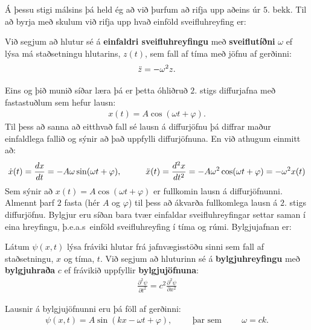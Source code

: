\ifdefined \wholebook \else\documentclass[oneside]{book}\usepackage{EdlBook}\graphicspath{{figures/}}
\begin{document}
Á þessu stigi málsins þá held ég að við þurfum að rifja upp aðeins úr $5.$ bekk. Til að byrja með skulum við rifja upp hvað einföld sveifluhreyfing er:

\begin{tcolorbox}
\begin{definition}
Við segjum að hlutur sé á \textbf{einfaldri sveifluhreyfingu} með \textbf{sveiflutíðni} $\omega$ ef lýsa má staðsetningu hlutarins, $z(t)$, sem fall af tíma með jöfnu af gerðinni:
\begin{align*}
    \Ddot{z} = - \omega^2z.
\end{align*}
\end{definition}
\end{tcolorbox}
Eins og þið munið síðar læra þá er þetta óhliðruð $2.$ stigs diffurjafna með fastastuðlum sem hefur lausn:
\begin{align*}
    x(t) = A\cos(\omega t + \varphi).
\end{align*}
Til þess að sanna að eitthvað fall sé lausn á diffurjöfnu þá diffrar maður einfaldlega fallið og sýnir að það uppfylli diffurjöfnuna. En við athugum einmitt að:
\begin{align*}
    \Dot{x}(t) =  \frac{dx}{dt} = -A\omega\sin(\omega t + \varphi), \hspace{1cm} \Ddot{x}(t) = \frac{d^2x}{dt^2} = -A\omega^2 \cos(\omega t + \varphi) = -\omega^2x(t)
\end{align*}
Sem sýnir að $x(t) = A\cos(\omega t + \varphi)$ er fullkomin lausn á diffurjöfnunni. Almennt þarf $2$ fasta (hér $A$ og $\varphi$) til þess að ákvarða fullkomlega lausn á $2.$ stigs diffurjöfnu. Bylgjur eru síðan bara tvær einfaldar sveifluhreyfingar settar saman í eina hreyfingu, þ.e.a.s~einföld sveifluhreyfing í tíma og rúmi. Bylgjujafnan er:
\begin{tcolorbox}
\begin{definition}
Látum $\psi(x,t)$ lýsa fráviki hlutar frá jafnvægisstöðu sinni sem fall af staðsetningu, $x$ og tíma, $t$. Við segjum að hluturinn sé á \textbf{bylgjuhreyfingu} með \textbf{bylgjuhraða} $c$ ef frávikið uppfyllir \textbf{bylgjujöfnuna}:
\begin{align*}
    \frac{\partial^2\psi}{\partial t^2} = c^2 \frac{\partial^2 \psi}{\partial x^2}
\end{align*}
\end{definition}
\end{tcolorbox}
Lausnir á bylgjujöfnunni eru þá föll af gerðinni:
\begin{align*}
    \psi(x,t) = A\sin(kx - \omega t + \varphi), \hspace{1cm} \text{þar sem} \hspace{1cm} \omega =  ck.
\end{align*}
\end{document}
